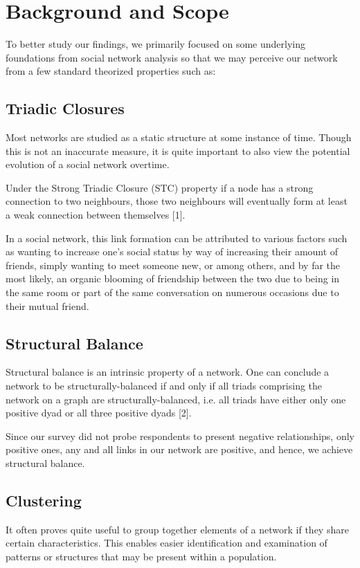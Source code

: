 \documentclass[runningheads]{llncs}
\begin{document}
\section{Background and Scope}
To better study our findings, we primarily focused on some underlying foundations from social network analysis so that we may perceive our network from a few standard theorized properties such as:

\subsection{Triadic Closures}
Most networks are studied as a static structure at some instance of time. Though this is not an inaccurate measure, it is quite important to also view the potential evolution of a social network overtime.

Under the Strong Triadic Closure (STC) property if a node has a strong connection to two neighbours, those two neighbours will eventually form at least a weak connection between themselves [1].

In a social network, this link formation can be attributed to various factors such as wanting to increase one's social status by way of increasing their amount of friends, simply wanting to meet someone new, or among others, and by far the most likely, an organic blooming of friendship between the two due to being in the same room or part of the same conversation on numerous occasions due to their mutual friend.

\subsection{Structural Balance}
Structural balance is an intrinsic property of a network. One can conclude a network to be structurally-balanced if and only if all triads comprising the network on a graph are structurally-balanced, i.e. all triads have either only one positive dyad or all three positive dyads [2].

Since our survey did not probe respondents to present negative relationships, only positive ones, any and all links in our network are positive, and hence, we achieve structural balance.

\subsection{Clustering}
It often proves quite useful to group together elements of a network if they share certain characteristics. This enables easier identification and examination of patterns or structures that may be present within a population.  
\end{document}
